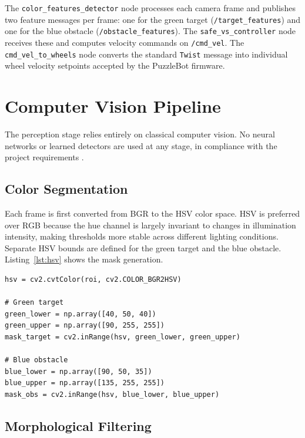 \documentclass[journal, 10pt]{IEEEtran}
\begin{document}
The \texttt{color\_features\_detector} node processes each camera frame and
publishes two feature messages per frame: one for the green target
(\texttt{/target\_features}) and one for the blue obstacle
(\texttt{/obstacle\_features}). The \texttt{safe\_vs\_controller} node
receives these and computes velocity commands on \texttt{/cmd\_vel}. The
\texttt{cmd\_vel\_to\_wheels} node converts the standard \texttt{Twist}
message into individual wheel velocity setpoints accepted by the PuzzleBot
firmware.

\section{Computer Vision Pipeline}
\label{sec:vision}

The perception stage relies entirely on classical computer vision. No
neural networks or learned detectors are used at any stage, in compliance
with the project requirements \cite{opencv}.

\subsection{Color Segmentation}

Each frame is first converted from BGR to the HSV color space. HSV is
preferred over RGB because the hue channel is largely invariant to changes
in illumination intensity, making thresholds more stable across different
lighting conditions. Separate HSV bounds are defined for the green target
and the blue obstacle. Listing~\ref{lst:hsv} shows the mask generation.

\begin{lstlisting}[caption={HSV mask generation for target and obstacle.},
                   label={lst:hsv}]
hsv = cv2.cvtColor(roi, cv2.COLOR_BGR2HSV)

# Green target
green_lower = np.array([40, 50, 40])
green_upper = np.array([90, 255, 255])
mask_target = cv2.inRange(hsv, green_lower, green_upper)

# Blue obstacle
blue_lower = np.array([90, 50, 35])
blue_upper = np.array([135, 255, 255])
mask_obs = cv2.inRange(hsv, blue_lower, blue_upper)
\end{lstlisting}

\subsection{Morphological Filtering}
\end{document}
